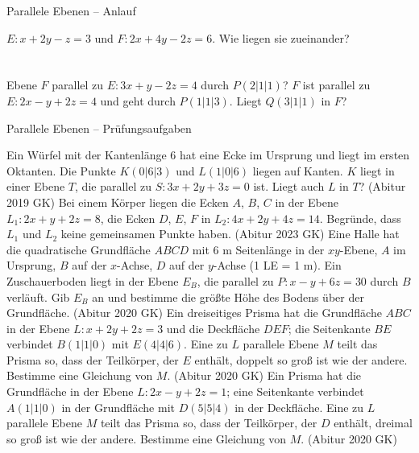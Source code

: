\begin{aufgabe}{Parallele Ebenen – Anlauf}
\begin{teile}
\teil $E\colon x + 2y - z = 3$ und $F\colon 2x + 4y - 2z = 6$. Wie liegen sie zueinander? \\  \\  \\ 
\teil Ebene $F$ parallel zu $E\colon 3x + y - 2z = 4$ durch $P(2 | 1 | 1)$?
\teil $F$ ist parallel zu $E\colon 2x - y + 2z = 4$ und geht durch $P(1 | 1 | 3)$. Liegt $Q(3 | 1 | 1)$ in $F$?
\end{teile}
\end{aufgabe}

\begin{aufgabe}{Parallele Ebenen – Prüfungsaufgaben}
\begin{teile}
\teil Ein Würfel mit der Kantenlänge 6 hat eine Ecke im Ursprung und liegt im ersten Oktanten. Die Punkte $K(0 | 6 | 3)$ und $L(1 | 0 | 6)$ liegen auf Kanten. $K$ liegt in einer Ebene $T$, die parallel zu $S\colon 3x + 2y + 3z = 0$ ist. Liegt auch $L$ in $T$? \hfill (Abitur 2019 GK)
\teil Bei einem Körper liegen die Ecken $A$, $B$, $C$ in der Ebene $L_1\colon 2x + y + 2z = 8$, die Ecken $D$, $E$, $F$ in $L_2\colon 4x + 2y + 4z = 14$. Begründe, dass $L_1$ und $L_2$ keine gemeinsamen Punkte haben. \hfill (Abitur 2023 GK)
\teil Eine Halle hat die quadratische Grundfläche $ABCD$ mit 6 m Seitenlänge in der $xy$-Ebene, $A$ im Ursprung, $B$ auf der $x$-Achse, $D$ auf der $y$-Achse (1 LE = 1 m). Ein Zuschauerboden liegt in der Ebene $E_B$, die parallel zu $P\colon x - y + 6z = 30$ durch $B$ verläuft. Gib $E_B$ an und bestimme die größte Höhe des Bodens über der Grundfläche. \hfill (Abitur 2020 GK)
\teil Ein dreiseitiges Prisma hat die Grundfläche $ABC$ in der Ebene $L\colon x + 2y + 2z = 3$ und die Deckfläche $DEF$; die Seitenkante $BE$ verbindet $B(1 | 1 | 0)$ mit $E(4 | 4 | 6)$. Eine zu $L$ parallele Ebene $M$ teilt das Prisma so, dass der Teilkörper, der $E$ enthält, doppelt so groß ist wie der andere. Bestimme eine Gleichung von $M$. \hfill (Abitur 2020 GK)
\teil Ein Prisma hat die Grundfläche in der Ebene $L\colon 2x - y + 2z = 1$; eine Seitenkante verbindet $A(1 | 1 | 0)$ in der Grundfläche mit $D(5 | 5 | 4)$ in der Deckfläche. Eine zu $L$ parallele Ebene $M$ teilt das Prisma so, dass der Teilkörper, der $D$ enthält, dreimal so groß ist wie der andere. Bestimme eine Gleichung von $M$. \hfill (Abitur 2020 GK)
\end{teile}
\end{aufgabe}


